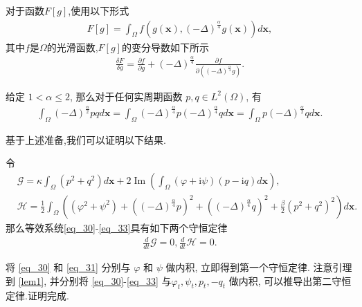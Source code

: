 \cite{wangStructurepreservingNumericalMethods2018}\begin{lem}\label{lem2}
对于函数$F[g]$,使用以下形式
\begin{align}\label{eq_25}
F[g]=\int_{\Omega} f\left(g(\boldsymbol{x}),(-\Delta)^{\frac{\alpha}{4}} g(\boldsymbol{x})\right) d \boldsymbol{x},
\end{align}
其中$f$是$\Omega$的光滑函数,$F[g]$的变分导数如下所示
\begin{align}\label{eq_26}
\frac{\delta F}{\delta g}=\frac{\partial f}{\partial g}+(-\Delta)^{\frac{\alpha}{4}} \frac{\partial f}{\partial\left((-\Delta)^{\frac{\alpha}{4}} g\right)} .
\end{align}
\end{lem}

\begin{lem}\label{lem1}
 给定 $1<\alpha \leq 2$, 那么对于任何实周期函数 $p, q \in L^{2}(\Omega)$, 有
\begin{align}\label{eq_22}
\int_{\Omega}(-\Delta)^{\frac{\alpha}{2}} p q d \boldsymbol{x}=\int_{\Omega}(-\Delta)^{\frac{\alpha}{4}} p(-\Delta)^{\frac{\alpha}{4}} q d \boldsymbol{x}=\int_{\Omega} p(-\Delta)^{\frac{\alpha}{2}} q d \boldsymbol{x}.
\end{align}
\end{lem}


基于上述准备,我们可以证明以下结果.
\begin{thm}	\label{thm2_1}
令
\begin{align}
&\mathcal{G}=\kappa\int_{\Omega}(p^2+q^2) d \boldsymbol{x}+2\operatorname{Im}(\int_{\Omega}(\varphi+\mathrm{i}\psi)(p-\mathrm{i}q)d \boldsymbol{x}),\label{eq_34} \\
&\mathcal{H}=\frac{1}{2}\int_{\Omega}\left((\varphi^2+\psi^2)+\left((-\Delta)^{\frac{\alpha}{4}} p\right)^{2}+\left((-\Delta)^{\frac{\alpha}{4}} q\right)^{2}+\frac{\beta}{2}(p^2+q^2)^{2}\right) d \boldsymbol{x}.\label{eq_35}
\end{align}
那么等效系统\eqref{eq_30}-\eqref{eq_33}具有如下两个守恒定律
\begin{align}
\frac{d}{d t} \mathcal{G}=0, \frac{d}{d t} \mathcal{H}=0.
\end{align}
\end{thm}

\begin{pf}
将 \eqref{eq_30} 和 \eqref{eq_31} 分别与 $\varphi$ 和 $\psi$ 做内积, 立即得到第一个守恒定律.
注意引理到 \ref{lem1}, 并分别将 \eqref{eq_30}-\eqref{eq_33} 与$\varphi_{t}, \psi_{t}, p_{t},-q_{t}$ 做内积, 可以推导出第二守恒定律.证明完成.
\end{pf}

